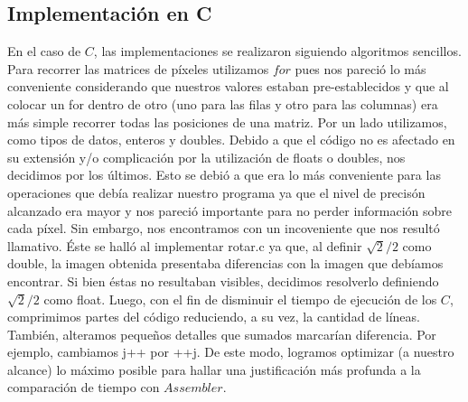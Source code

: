\documentclass[10pt, a4paper]{article}
\begin{document}
\subsection{Implementación en C}
En el caso de $C$, las implementaciones se realizaron siguiendo algoritmos sencillos. Para recorrer las matrices de píxeles utilizamos $for$ pues nos pareció lo más conveniente considerando que nuestros valores estaban pre-establecidos y que al colocar un for dentro de otro (uno para las filas y otro para las columnas) era más simple recorrer todas las posiciones de una matriz.
\newline
Por un lado utilizamos, como tipos de datos, enteros y doubles. Debido a que el código no es afectado en su extensión y/o complicación por la utilización de floats o doubles, nos decidimos por los últimos. Esto se debió a que era lo más conveniente para las operaciones que debía realizar nuestro programa ya que el nivel de precisón alcanzado era mayor y nos pareció importante para no perder información sobre cada píxel. Sin embargo, nos encontramos con un incoveniente que nos resultó llamativo. Éste se halló al implementar rotar.c ya que, al definir $\sqrt{2}/2$ como double, la imagen obtenida presentaba diferencias con la imagen que debíamos encontrar. Si bien éstas no resultaban visibles, decidimos resolverlo definiendo $\sqrt{2}/2$ como float.\newline
\newline
Luego, con el fin de disminuir el tiempo de ejecución de los $C$, comprimimos partes del código reduciendo, a su vez, la cantidad de líneas. También, alteramos pequeños detalles que sumados marcarían diferencia. Por ejemplo, cambiamos j++ por ++j. De este modo, logramos optimizar (a nuestro alcance) lo máximo posible para hallar una justificación más profunda a la comparación de tiempo con $Assembler$. 
\end{document}
